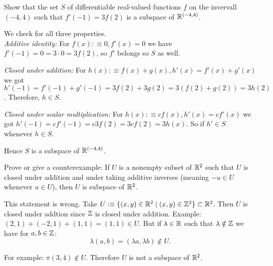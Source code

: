 \begin{xrcs}
  Show that the set $S$ of differentiable real-valued functions $f$ on the invervall $(-4,4)$ such that $f'(-1) = 3f(2)$ is a subspace of $\mathbb{R}^{(-4,4)}$.

  \begin{xsol} We check for all three properties. \\
    \emph{Additive identity:} For $f(x) :\equiv 0, f'(x) = 0$ we have $f'(-1) = 0 = 3 \cdot 0 = 3f(2)$, so $f'$ belongs so $S$ as well.

    \emph{Closed under addition:} For $h(x) :\equiv f(x) + g(x), h'(x) = f'(x) + g'(x)$ we got $h'(-1) = f'(-1) + g'(-1) = 3f(2) + 3g(2) = 3(f(2)+g(2)) = 3h(2)$. Therefore, $h \in S$.

    \emph{Closed under scalar multiplication:} For $h(x) :\equiv cf(x), h'(x) = cf'(x)$ we got $h'(-1) = cf'(-1) = c3f(2) = 3cf(2) = 3h(x)$. So if $h' \in S$ whenever $h \in S$.

    Hence $S$ is a subspace of $\mathbb{R}^{(-4,4)}$.
  \end{xsol}
\end{xrcs}

\setcounter{xrcscount}{7}
\begin{xrcs}
  Prove or give a counterexample: If $U$ is a nonempty subset of $\mathbb{R}^2$ such that $U$ is closed under addition and under taking additive inverses (meaning $-u \in U$ whenever $u \in U$), then $U$ is subspace of $\mathbb{R}^2$.

  \begin{xsol}
    This statement is wrong. Take $U :\equiv \{(x,y) \in \mathbb{R}^2 \mid (x,y) \in \mathbb{Z}^2 \} \subset \mathbb{R}^2$. Then $U$ is closed under addtion since $\mathbb{Z}$ is closed under addition. Example: $(2,1)+(-2,1)+(1,1) = (1,1) \in U$. But if $\lambda \in \mathbb{R}$ such that $\lambda \notin \mathbb{Z}$ we have for $a,b \in \mathbb{Z}$:
  \[
  \lambda(a,b) = (\lambda a, \lambda b) \notin U.
  \]

  For example: $\pi (3,4) \notin U$. Therefore $U$ is not a subspace of $\mathbb{R}^2$.
  \end{xsol}
\end{xrcs}



